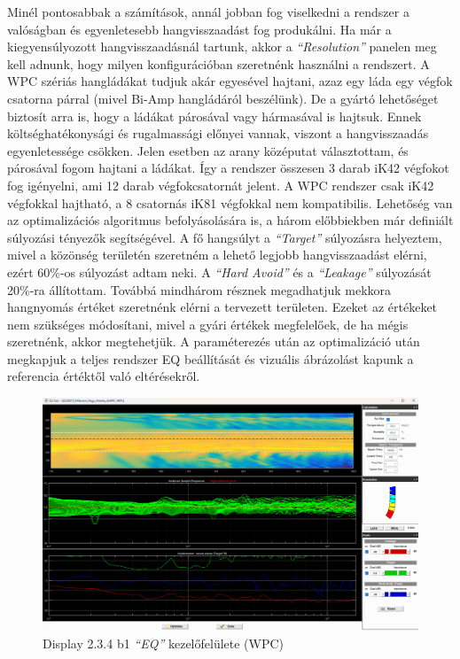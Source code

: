 Minél pontosabbak a számítások, annál jobban fog viselkedni a rendszer a valóságban és egyenletesebb hangvisszaadást fog produkálni.
Ha már a kiegyensúlyozott hangvisszaadásnál tartunk, akkor a \textit{``Resolution''} panelen meg kell adnunk, hogy milyen
konfigurációban szeretnénk használni a rendszert. A WPC szériás hangládákat tudjuk akár egyesével hajtani, azaz egy láda egy végfok csatorna
párral (mivel Bi-Amp hangládáról beszélünk). De a gyártó lehetőséget biztosít arra is, hogy a ládákat párosával vagy hármasával is hajtsuk.
Ennek költséghatékonysági és rugalmassági előnyei vannak, viszont a hangvisszaadás egyenletessége csökken. Jelen esetben 
az arany középutat választottam, és párosával fogom hajtani a ládákat. Így a rendszer összesen 3 darab iK42 végfokot fog igényelni, ami 
12 darab végfokcsatornát jelent. A WPC rendszer csak iK42 végfokkal hajtható, a 8 csatornás iK81 végfokkal nem kompatibilis.
Lehetőség van az optimalizációs algoritmus befolyásolására is, a három előbbiekben már definiált súlyozási tényezők segítségével.
A fő hangsúlyt a \textit{``Target''} súlyozásra helyeztem, mivel a közönség területén szeretném a lehető legjobb hangvisszaadást elérni,
ezért 60\%-os súlyozást adtam neki.
A \textit{``Hard Avoid''} és a \textit{``Leakage''} súlyozását 20\%-ra állítottam.
Továbbá mindhárom résznek megadhatjuk mekkora hangnyomás értéket szeretnénk elérni a tervezett területen. Ezeket az értékeket
nem szükséges módosítani, mivel a gyári értékek megfelelőek, de ha mégis szeretnénk, akkor megtehetjük.
A paraméterezés után az optimalizáció után megkapjuk a teljes rendszer EQ beállítását és vizuális ábrázolást kapunk 
a referencia értéktől való eltérésekről.
\begin{figure}[H]
	\centering
	\includegraphics[width=\textwidth, keepaspectratio]{figures/display_wpc_5.png}
	\caption{Display 2.3.4 b1 \textit{``EQ''} kezelőfelülete (WPC)}\label{fig:display_wpc_5}
\end{figure}
